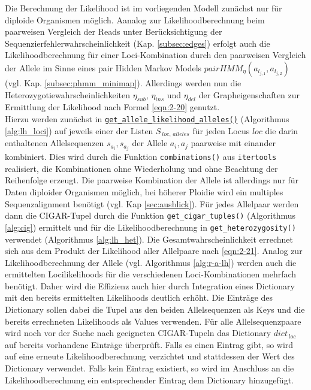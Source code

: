 Die Berechnung der Likelihood ist im vorliegenden Modell zunächst nur für diploide Organismen möglich. Aanalog zur Likelihoodberechnung beim paarweisen Vergleich der Reads unter Berücksichtigung der Sequenzierfehlerwahrscheinlichkeit (Kap. \ref{subsec:edges}) erfolgt auch die Likelihoodberechnung für einer Loci-Kombination durch den paarweisen Vergleich der Allele im Sinne eines pair Hidden Markov Models $ pairHMM_{\eta}(a_{l_{j,1}}, a_{l_{j,2}}) $ (vgl. Kap. \ref{subsec:phmm_minimap}). Allerdings werden nun die Heterozygotiewahrscheinlichkeiten $\eta_{sub}$, $\eta_{ins}$ und $\eta_{del}$ der Grapheigenschaften zur Ermittlung der Likelihood nach Formel \eqref{eqn:2-20} genutzt.  \\

Hierzu werden zunächst in \hyperref[schritt16]{\lstinline|get_allele_likelihood_alleles()|\label{schritt16txt}} (Algorithmus \ref{alg:lh_loci}) auf jeweils einer der Listen $S_{\,loc,\, alleles}$ für jeden Locus $loc$ die darin enthaltenen Allelsequenzen $s_{a_{i}}, s_{a_{j}}$  der Allele ${a_{i}, a_{j}}$ paarweise mit einander kombiniert. Dies wird durch die Funktion \lstinline|combinations()| aus  \lstinline|itertools| realisiert, die Kombinationen ohne Wiederholung und ohne Beachtung der Reihenfolge erzeugt. Die paarweise Kombination der Allele ist allerdings nur für Daten diploider Organismen möglich, bei höherer Ploidie wird ein multiples Sequenzalignment benötigt (vgl. Kap \ref{sec:ausblick}). Für jedes Allelpaar werden dann die CIGAR-Tupel durch die Funktion \lstinline|get_cigar_tuples()| (Algorithmus \ref{alg:cig}) ermittelt und für die Likelihoodberechnung in \lstinline|get_heterozygosity()| verwendet (Algorithmus \ref{alg:lh_het}). Die Gesamtwahrscheinlichkeit errechnet sich aus dem Produkt der Likelihood aller Allelpaare nach \ref{eqn:2-21}. Analog zur Likelihoodberechnung der Allele (vgl. Algorithmus \ref{alg:r-a-lh}) werden auch die ermittelten Locilikelihoods für die verschiedenen Loci-Kombinationen mehrfach benötigt. Daher wird die Effizienz auch hier durch Integration eines Dictionary mit den bereits ermittelten Likelihoods deutlich erhöht. Die Einträge des Dictionary sollen dabei die Tupel aus den beiden Allelsequenzen als Keys und die bereits errechneten Likelihoods als Values verwenden. Für alle Allelsequenzpaare wird noch vor der Suche nach geeigneten CIGAR-Tupeln das Dictionary $ dict_{\,loc} $ auf bereits vorhandene Einträge überprüft.  Falls es einen Eintrag gibt, so wird auf eine erneute Likelihoodberechnung verzichtet und stattdessen der Wert des Dictionary verwendet. Falls kein Eintrag existiert, so wird im Anschluss an die Likelihoodberechnung ein entsprechender Eintrag dem Dictionary hinzugefügt.

